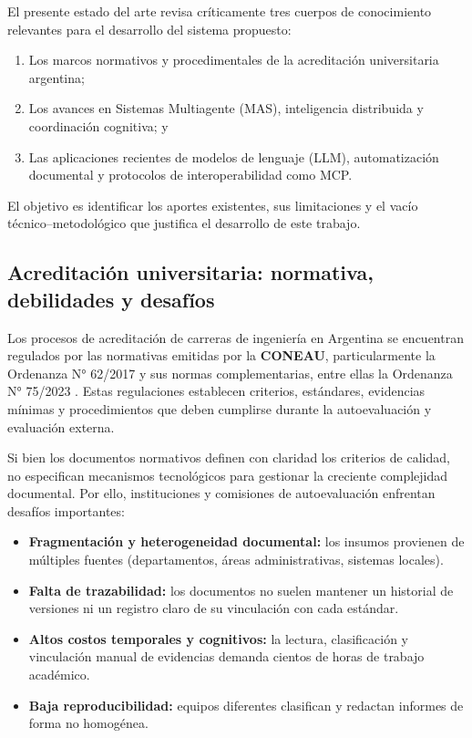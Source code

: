 \documentclass[12pt]{article}
\let\cite\citep
\begin{document}
El presente estado del arte revisa críticamente tres cuerpos de conocimiento relevantes para el desarrollo del sistema propuesto:  
\begin{enumerate}
    \item Los marcos normativos y procedimentales de la acreditación universitaria argentina;  
\item Los avances en Sistemas Multiagente (MAS), inteligencia distribuida y coordinación cognitiva; y  
\item Las aplicaciones recientes de modelos de lenguaje (LLM), automatización documental y protocolos de interoperabilidad como MCP.  
\end{enumerate}


El objetivo es identificar los aportes existentes, sus limitaciones y el vacío técnico–metodológico que justifica el desarrollo de este trabajo.

\subsection{Acreditación universitaria: normativa, debilidades y desafíos}

Los procesos de acreditación de carreras de ingeniería en Argentina se encuentran regulados por las normativas emitidas por la \textbf{CONEAU}, particularmente la Ordenanza N° 62/2017 \cite{ordenanza62} y sus normas complementarias, entre ellas la Ordenanza N° 75/2023 \cite{ordenanza75}.  
Estas regulaciones establecen criterios, estándares, evidencias mínimas y procedimientos que deben cumplirse durante la autoevaluación y evaluación externa.

Si bien los documentos normativos definen con claridad los criterios de calidad, no especifican mecanismos tecnológicos para gestionar la creciente complejidad documental. Por ello, instituciones y comisiones de autoevaluación enfrentan desafíos importantes:

\begin{itemize}
    \item \textbf{Fragmentación y heterogeneidad documental:} los insumos provienen de múltiples fuentes (departamentos, áreas administrativas, sistemas locales).
    \item \textbf{Falta de trazabilidad:} los documentos no suelen mantener un historial de versiones ni un registro claro de su vinculación con cada estándar.
    \item \textbf{Altos costos temporales y cognitivos:} la lectura, clasificación y vinculación manual de evidencias demanda cientos de horas de trabajo académico.
    \item \textbf{Baja reproducibilidad:} equipos diferentes clasifican y redactan informes de forma no homogénea.
\end{itemize}
\end{document}
